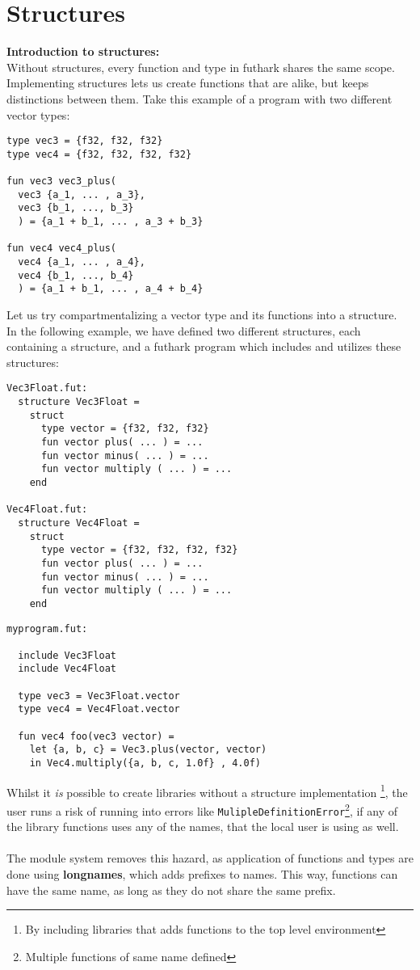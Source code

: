 \section{Structures}
\label{sec:structures}
\textbf{Introduction to structures:}\\
\label{subsec:structuresintroduction}
Without structures, every function and type in futhark shares the same scope.
Implementing structures lets us create functions that are alike, but keeps
distinctions between them.
Take this example of a program with two different vector types:
\begin{verbatim}
type vec3 = {f32, f32, f32}
type vec4 = {f32, f32, f32, f32}

fun vec3 vec3_plus(
  vec3 {a_1, ... , a_3}, 
  vec3 {b_1, ..., b_3}
  ) = {a_1 + b_1, ... , a_3 + b_3}

fun vec4 vec4_plus(
  vec4 {a_1, ... , a_4}, 
  vec4 {b_1, ..., b_4}
  ) = {a_1 + b_1, ... , a_4 + b_4}
\end{verbatim}
\noindent
Let us try compartmentalizing a vector type and its functions into a structure.\\
  In the following example, we have defined two different structures, each
containing a structure,
and a futhark program which includes and utilizes these structures:
\begin{verbatim}
Vec3Float.fut:
  structure Vec3Float = 
    struct
      type vector = {f32, f32, f32}
      fun vector plus( ... ) = ...
      fun vector minus( ... ) = ...
      fun vector multiply ( ... ) = ...
    end

Vec4Float.fut:
  structure Vec4Float = 
    struct
      type vector = {f32, f32, f32, f32}
      fun vector plus( ... ) = ...
      fun vector minus( ... ) = ...
      fun vector multiply ( ... ) = ...
    end
\end{verbatim}
\clearpage
\begin{verbatim}
myprogram.fut:

  include Vec3Float
  include Vec4Float

  type vec3 = Vec3Float.vector
  type vec4 = Vec4Float.vector
  
  fun vec4 foo(vec3 vector) = 
    let {a, b, c} = Vec3.plus(vector, vector)
    in Vec4.multiply({a, b, c, 1.0f} , 4.0f)
\end{verbatim}
\noindent
Whilst it \textit{is} possible to create libraries without a structure
implementation \footnote{By including libraries that adds functions to the top
  level environment}, the user runs a risk of running into errors like
\texttt{MulipleDefinitionError}\footnote{Multiple functions of same name
  defined}, if any of the library functions uses any of the names, that the
local user is using as well.
\\\\
The module system removes this hazard, as application of functions and types are
done using \textbf{longnames}, which adds prefixes to names. This way, functions
can have the same name, as long as they do not share the same prefix.

